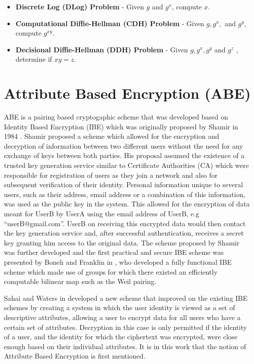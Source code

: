 \begin{itemize}
	
	\item \textbf{Discrete Log (DLog) Problem} - Given $ g $ and $ g^{x} $, compute $ x $.
	
	\item \textbf{Computational Diffie-Hellman (CDH) Problem} - Given $ g, g^{x}, $ and $ g^{y} $, compute $ g^{xy} $.
	
	\item \textbf{Decisional Diffie-Hellman (DDH) Problem} - Given $ g, g^{x}, g^{y} $ and $ g^{z} $ , determine if $ xy = z $.	 
	
\end{itemize}

\section{Attribute Based Encryption (ABE)}\label{abe}

ABE is a pairing based cryptogaphic scheme that was developed based on Identity Based Encryption (IBE) which was originally proposed by Shamir in 1984 \cite{Shamir1985}. Shamir proposed a scheme which allowed for the encryption and decryption of information between two different users without the need for any exchange of keys between both parties. His proposal assumed the existence of a trusted key generation service similar to Certificate Authorities (CA) which were responsible for registration of users as they join a network and also for subsequent verification of their identity. Personal information unique to several users, such as their address, email address or a combination of this information, was used as the public key in the system. This allowed for the encryption of data meant for UserB by UserA using the email address of UserB, e.g “userB@gmail.com”. UserB on receiving this encrypted data would then contact the key generation service and, after successful authentication, receives a secret key granting him access to the original data. The scheme proposed by Shamir was further developed and the first practical and secure IBE scheme was presented by Boneh and Franklin in \cite{Boneh2003}, who developed a fully functional IBE scheme which made use of groups for which there existed an efficiently computable bilinear map such as the Weil pairing.

Sahai and Waters in \cite{Sahai2005} developed a new scheme that improved on the existing IBE schemes by creating a system in which the user identity is viewed as a set of descriptive attributes, allowing a user to encrypt data for all users who have a certain set of attributes. Decryption in this case is only permitted if the identity of a user, and the identity for which the ciphertext was encrypted, were close enough based on their individual attributes. It is in this work that the notion of Attribute Based Encryption is first mentioned.

